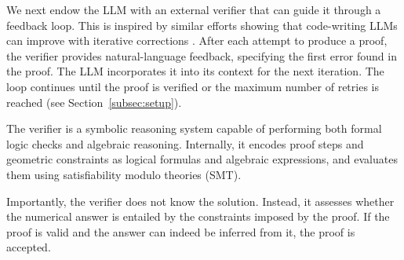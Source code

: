 


We next endow the LLM with an external verifier that can guide it through a feedback loop. 
This is inspired by similar efforts showing that code-writing LLMs can improve with iterative corrections 
\cite{peng2025perfcodegen, palavalli2024using}.
After each attempt to produce a proof, the verifier provides natural-language feedback, specifying the first error found in the proof. The LLM incorporates it into its context for the next iteration. The loop continues until the proof is verified or the maximum number of retries is reached (see Section~\ref{subsec:setup}).



The verifier is a symbolic reasoning system capable of performing both formal logic checks and algebraic reasoning. %
Internally, it encodes proof steps and geometric constraints as logical formulas and algebraic expressions, and evaluates them using satisfiability modulo theories (SMT). %


Importantly, the verifier does not know the solution. Instead, it assesses whether the numerical answer is  entailed by the constraints imposed by the proof. If the proof is valid and the answer can indeed be inferred from it, the proof is accepted. %


